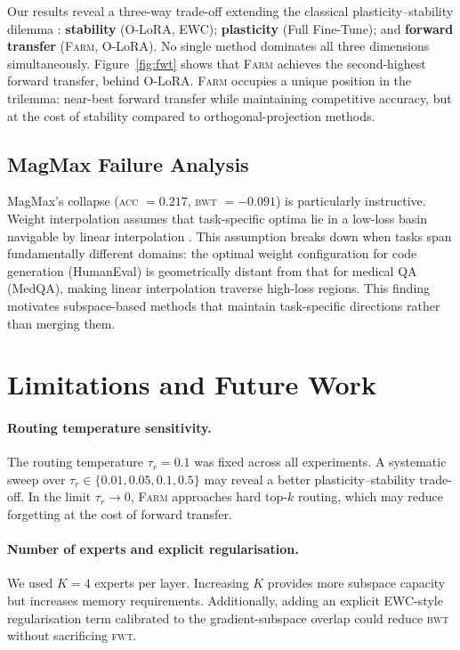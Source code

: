 \documentclass{article}
\newcommand{\FARM}{\textsc{Farm}}
\newcommand{\ACC}{\textsc{acc}}
\newcommand{\BWT}{\textsc{bwt}}
\newcommand{\FWT}{\textsc{fwt}}
\begin{document}
Our results reveal a three-way trade-off extending the classical plasticity–stability dilemma \citep{grossberg1982studies}: \textbf{stability} (O-LoRA, EWC); \textbf{plasticity} (Full Fine-Tune); and \textbf{forward transfer} (\FARM{}, O-LoRA). No single method dominates all three dimensions simultaneously. Figure~\ref{fig:fwt} shows that \FARM{} achieves the second-highest forward transfer, behind O-LoRA. \FARM{} occupies a unique position in the trilemma: near-best forward transfer while maintaining competitive accuracy, but at the cost of stability compared to orthogonal-projection methods.

\subsection{MagMax Failure Analysis}

MagMax's collapse (\ACC{} $= 0.217$, \BWT{} $= -0.091$) is particularly instructive. Weight interpolation assumes that task-specific optima lie in a low-loss basin navigable by linear interpolation \citep{frankle2020linear}. This assumption breaks down when tasks span fundamentally different domains: the optimal weight configuration for code generation (HumanEval) is geometrically distant from that for medical QA (MedQA), making linear interpolation traverse high-loss regions. This finding motivates subspace-based methods that maintain task-specific directions rather than merging them.

\section{Limitations and Future Work}
\label{sec:limitations}

\paragraph{Routing temperature sensitivity.}
The routing temperature $\tau_r = 0.1$ was fixed across all experiments. A systematic sweep over $\tau_r \in \{0.01, 0.05, 0.1, 0.5\}$ may reveal a better plasticity–stability trade-off. In the limit $\tau_r \to 0$, \FARM{} approaches hard top-$k$ routing, which may reduce forgetting at the cost of forward transfer.

\paragraph{Number of experts and explicit regularisation.}
We used $K = 4$ experts per layer. Increasing $K$ provides more subspace capacity but increases memory requirements. Additionally, adding an explicit EWC-style regularisation term calibrated to the gradient-subspace overlap could reduce \BWT{} without sacrificing \FWT{}.
\end{document}
